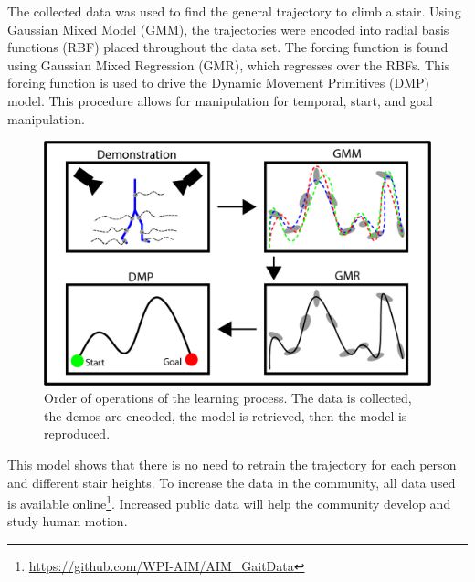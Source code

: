 The collected data was used to find the general trajectory to climb a stair. Using Gaussian Mixed Model (GMM), the trajectories were encoded into radial basis functions (RBF) placed throughout the data set. The forcing function is found using Gaussian Mixed Regression (GMR), which regresses over the RBFs. This forcing function is used to drive the Dynamic Movement Primitives (DMP) model. This procedure allows for manipulation for temporal, start, and goal manipulation.

\begin{figure} 
    \centering 
    \includegraphics[scale=0.2]{images/demo_figure.png} 
    \caption{Order of operations of the learning process. The data is collected, the demos are encoded, the model is retrieved, then the model is reproduced.} 
    \label{fig:demostation} 
\end{figure} 


This model shows that there is no need to retrain the trajectory for each person and different stair heights. To increase the data in the community, all data used is available online\footnote{\url{https://github.com/WPI-AIM/AIM\_GaitData}}. Increased public data will help the community develop and study human motion.